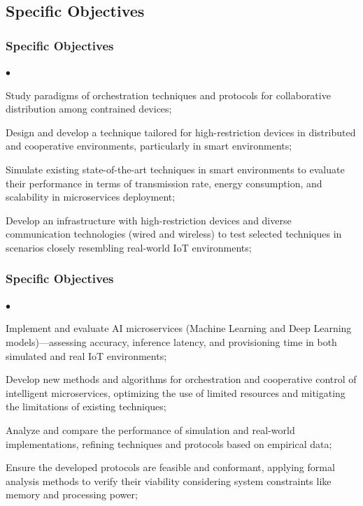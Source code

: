 \documentclass[tikz]{beamer}
\begin{document}
\subsection{Specific Objectives}
\begin{frame}
\frametitle{Specific Objectives}
\begin{list}{$\bullet$}{}
    \item Study paradigms of orchestration techniques and protocols for collaborative distribution among contrained devices;\\

    \item Design and develop a technique tailored for high-restriction devices in distributed and cooperative environments, particularly in smart environments;
    \item Simulate existing state-of-the-art techniques in smart environments to evaluate their performance in terms of transmission rate, energy consumption, and scalability in microservices deployment;
    \item Develop an infrastructure with high-restriction devices and diverse communication technologies (wired and wireless) to test selected techniques in scenarios closely resembling real-world IoT environments;
\end{list}
\end{frame}

\begin{frame}
\frametitle{Specific Objectives}
\begin{list}{$\bullet$}{}
    \item Implement and evaluate AI microservices (Machine Learning and Deep Learning models)—assessing accuracy, inference latency, and provisioning time in both simulated and real IoT environments;
    \item Develop new methods and algorithms for orchestration and cooperative control of intelligent microservices, optimizing the use of limited resources and mitigating the limitations of existing techniques;
    \item Analyze and compare the performance of simulation and real-world implementations, refining techniques and protocols based on empirical data;
    \item Ensure the developed protocols are feasible and conformant, applying formal analysis methods to verify their viability considering system constraints like memory and processing power;
\end{list}
\end{frame}
\end{document}
